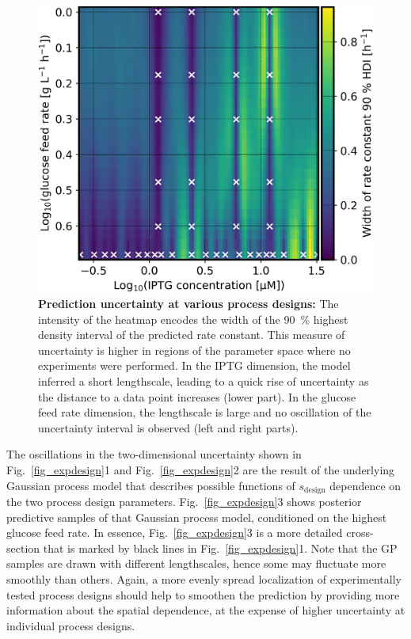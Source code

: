 \documentclass[sn-standardnature]{sn-jnl}%
\theoremstyle{thmstyleone}%
\theoremstyle{thmstyletwo}%
\theoremstyle{thmstylethree}%
\begin{document}
\begin{figure}[H]
    \centering
    \includegraphics[width=1.0\textwidth]{figures/plot_pp_dense_dense_k_design_interval.png}
    \caption{
        \textbf{Prediction uncertainty at various process designs:}
        The intensity of the heatmap encodes the width of the 90~\% highest density interval of the predicted rate constant.
        This measure of uncertainty is higher in regions of the parameter space where no experiments were performed.
        In the IPTG dimension, the model inferred a short lengthscale, leading to a quick rise of uncertainty as the distance to a data point increases (lower part).
        In the glucose feed rate dimension, the lengthscale is large and no oscillation of the uncertainty interval is observed (left and right parts).
    }
    \label{fig_sdesign_interval}
\end{figure}

The oscillations in the two-dimensional uncertainty shown in Fig.~\ref{fig_expdesign}1 and Fig.~\ref{fig_expdesign}2 are the result of the underlying Gaussian process model that describes possible functions of $s_\text{design}$ dependence on the two process design parameters.
Fig.~\ref{fig_expdesign}3 shows posterior predictive samples of that Gaussian process model, conditioned on the highest glucose feed rate.
In essence, Fig.~\ref{fig_expdesign}3 is a more detailed cross-section that is marked by black lines in Fig.~\ref{fig_expdesign}1.
Note that the GP samples are drawn with different lengthscales, hence some may fluctuate more smoothly than others.
Again, a more evenly spread localization of experimentally tested process designs should help to smoothen the prediction by providing more information about the spatial dependence, at the expense of higher uncertainty at individual process designs.
\end{document}

